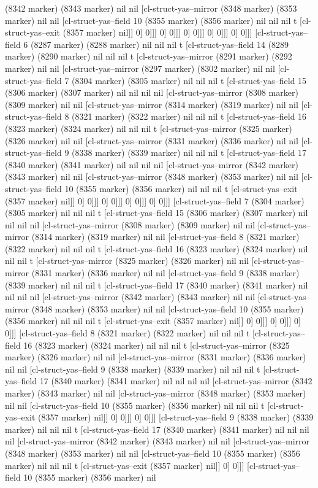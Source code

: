 {{(8342 marker) (8343 marker) nil nil [cl-struct-yas--mirror (8348 marker) (8353 marker) nil nil [cl-struct-yas--field 10 (8355 marker) (8356 marker) nil nil nil t [cl-struct-yas--exit (8357 marker) nil]] 0] 0]]] 0] 0]]] 0] 0]]] 0] 0]]] 0] 0]]] [cl-struct-yas--field 6 (8287 marker) (8288 marker) nil nil nil t [cl-struct-yas--field 14 (8289 marker) (8290 marker) nil nil nil t [cl-struct-yas--mirror (8291 marker) (8292 marker) nil nil [cl-struct-yas--mirror (8297 marker) (8302 marker) nil nil [cl-struct-yas--field 7 (8304 marker) (8305 marker) nil nil nil t [cl-struct-yas--field 15 (8306 marker) (8307 marker) nil nil nil nil [cl-struct-yas--mirror (8308 marker) (8309 marker) nil nil [cl-struct-yas--mirror (8314 marker) (8319 marker) nil nil [cl-struct-yas--field 8 (8321 marker) (8322 marker) nil nil nil t [cl-struct-yas--field 16 (8323 marker) (8324 marker) nil nil nil t [cl-struct-yas--mirror (8325 marker) (8326 marker) nil nil [cl-struct-yas--mirror (8331 marker) (8336 marker) nil nil [cl-struct-yas--field 9 (8338 marker) (8339 marker) nil nil nil t [cl-struct-yas--field 17 (8340 marker) (8341 marker) nil nil nil nil [cl-struct-yas--mirror (8342 marker) (8343 marker) nil nil [cl-struct-yas--mirror (8348 marker) (8353 marker) nil nil [cl-struct-yas--field 10 (8355 marker) (8356 marker) nil nil nil t [cl-struct-yas--exit (8357 marker) nil]] 0] 0]]] 0] 0]]] 0] 0]]] 0] 0]]] [cl-struct-yas--field 7 (8304 marker) (8305 marker) nil nil nil t [cl-struct-yas--field 15 (8306 marker) (8307 marker) nil nil nil nil [cl-struct-yas--mirror (8308 marker) (8309 marker) nil nil [cl-struct-yas--mirror (8314 marker) (8319 marker) nil nil [cl-struct-yas--field 8 (8321 marker) (8322 marker) nil nil nil t [cl-struct-yas--field 16 (8323 marker) (8324 marker) nil nil nil t [cl-struct-yas--mirror (8325 marker) (8326 marker) nil nil [cl-struct-yas--mirror (8331 marker) (8336 marker) nil nil [cl-struct-yas--field 9 (8338 marker) (8339 marker) nil nil nil t [cl-struct-yas--field 17 (8340 marker) (8341 marker) nil nil nil nil [cl-struct-yas--mirror (8342 marker) (8343 marker) nil nil [cl-struct-yas--mirror (8348 marker) (8353 marker) nil nil [cl-struct-yas--field 10 (8355 marker) (8356 marker) nil nil nil t [cl-struct-yas--exit (8357 marker) nil]] 0] 0]]] 0] 0]]] 0] 0]]] [cl-struct-yas--field 8 (8321 marker) (8322 marker) nil nil nil t [cl-struct-yas--field 16 (8323 marker) (8324 marker) nil nil nil t [cl-struct-yas--mirror (8325 marker) (8326 marker) nil nil [cl-struct-yas--mirror (8331 marker) (8336 marker) nil nil [cl-struct-yas--field 9 (8338 marker) (8339 marker) nil nil nil t [cl-struct-yas--field 17 (8340 marker) (8341 marker) nil nil nil nil [cl-struct-yas--mirror (8342 marker) (8343 marker) nil nil [cl-struct-yas--mirror (8348 marker) (8353 marker) nil nil [cl-struct-yas--field 10 (8355 marker) (8356 marker) nil nil nil t [cl-struct-yas--exit (8357 marker) nil]] 0] 0]]] 0] 0]]] [cl-struct-yas--field 9 (8338 marker) (8339 marker) nil nil nil t [cl-struct-yas--field 17 (8340 marker) (8341 marker) nil nil nil nil [cl-struct-yas--mirror (8342 marker) (8343 marker) nil nil [cl-struct-yas--mirror (8348 marker) (8353 marker) nil nil [cl-struct-yas--field 10 (8355 marker) (8356 marker) nil nil nil t [cl-struct-yas--exit (8357 marker) nil]] 0] 0]]] [cl-struct-yas--field 10 (8355 marker) (8356 marker) nil }}

